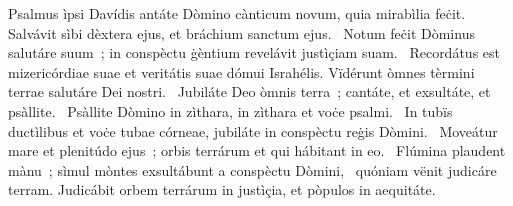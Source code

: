 { Psalmus ìpsi Davídis}
{%
antáte Dòmino cànticum novum, quia mirabìlia feċit. Salvávit sìbi dèxtera ejus, et bráchium sanctum ejus. 
~Notum feċit Dòminus salutáre suum~; in conspèctu ġèntium revelávit justìçiam suam. 
~Recordátus est mizericórdiae suae et veritátis suae dómui Israhélis. Vïdérunt òmnes tèrmini terrae salutáre Dei nostri. 
~Jubiláte Deo òmnis terra~; cantáte, et exsultáte, et psàllite. 
~Psàllite Dòmino in zìthara, in zìthara et voċe psalmi. 
~In tubïs ductìlibus et voċe tubae córneae, jubiláte in conspèctu reġis Dòmini. 
~Moveátur mare et plenitúdo ejus~; orbis terrárum et qui hábitant in eo. 
~Flúmina plaudent mànu~; sìmul mòntes exsultábunt a conspèctu Dòmini, 
~quóniam vënit judicáre terram. Judicábit orbem terrárum in justìçia, et pòpulos in aequitáte. 
}
